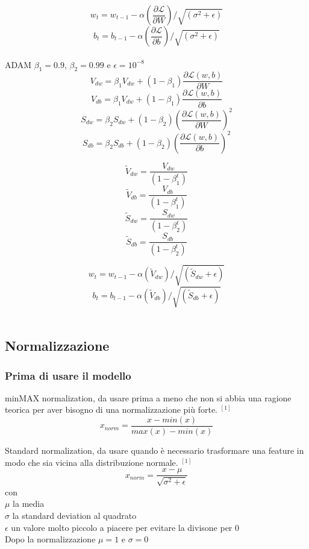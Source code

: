 \documentclass[]{article}
\newcommand{\Lagr}{\mathcal{L}}
\begin{document}
\[w_t = w_{t-1} - \alpha (\frac{\partial \Lagr}{\partial W})/\sqrt{(\sigma ^2 + \epsilon)}  \]
\[b_t = b_{t-1} - \alpha (\frac{\partial \Lagr}{\partial b})/\sqrt{(\sigma ^2 + \epsilon)}    \]\\

ADAM $\beta_1 = 0.9$, $\beta_2 = 0.99$ e $\epsilon = 10^{-8}$
\[ V_{dw} = \beta_1 V_{dw} + (1- \beta_1) \frac{ \partial \Lagr(w,b)}{\partial W} \]
\[ V_{db} = \beta_1 V_{dw} + (1- \beta_1) \frac{ \partial \Lagr(w,b)}{\partial b} \]
\[ S_{dw} = \beta_2 S_{dw} + (1- \beta_2) (\frac{ \partial \Lagr(w,b)}{\partial W})^2 \]
\[ S_{db} = \beta_2 S_{db} + (1- \beta_2) (\frac{ \partial \Lagr(w,b)}{\partial b})^2 \]

\[ \tilde{V}_{dw} = \frac{V_{dw}}{(1-\beta_1^t)} \]
\[ \tilde{V}_{db} = \frac{V_{db}}{(1-\beta_1^t)}  \]
\[ \tilde{S}_{dw} = \frac{S_{dw}}{(1-\beta_2^t)} \]
\[ \tilde{S}_{db} = \frac{S_{db}}{(1-\beta_2^t)}  \]


\[ w_t = w_{t-1} - \alpha (\tilde{V}_{dw})/\sqrt{(\tilde{S}_{dw} + \epsilon)}  \]
\[ b_t = b_{t-1} - \alpha (\tilde{V}_{db})/\sqrt{(\tilde{S}_{db} + \epsilon)}   \] \\

\subsection{Normalizzazione}
\subsubsection{Prima di usare il modello}
minMAX normalization, da usare prima a meno che non si abbia una ragione teorica per aver bisogno di una normalizzazione più forte. $^{[1]}$
\[ x_{norm} = \frac{x-min(x)}{max(x)-min(x)}\]

Standard normalization, da usare quando è necessario trasformare una feature in modo che sia vicina alla distribuzione normale. $^{[1]}$
\[ x_{norm} = \frac{x-\mu}{\sqrt{\sigma^2+\epsilon}} \]
con\\
$\mu$ la media \\
$\sigma$ la standard deviation al quadrato\\
$\epsilon$ un valore molto piccolo a piacere per evitare la divisone per 0\\
Dopo la normalizzazione $\mu=1$ e $\sigma=0$\\\\
\end{document}
